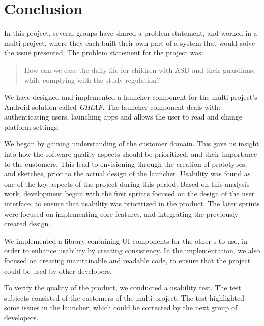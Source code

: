 \chapter{Conclusion}
In this project, several groups have shared a problem statement, and worked in a multi-project, where they each built their own part of a system that would solve the issue presented. 
The problem statement for the project was:    
 
\begin{quotation}
How can we ease the daily life for children with ASD and their guardians, while complying with the study regulation? 
\end{quotation}

We have designed and implemented a launcher component for the multi-project's Android solution called \emph{GIRAF}. The launcher component deals with: authenticating users, launching apps and allows the user to read and change platform settings. 

We began by gaining understanding of the customer domain. This gave us insight into how the software quality aspects should be prioritized, and their importance to the customers. 
This lead to envisioning through the creation of prototypes, and sketches, prior to the actual design of the launcher. Usability was found as one of the key aspects of the project during this period.
Based on this analysis work, development began with the first sprints focused on the design of the user interface, to ensure that usability was prioritized in the product. The later sprints were focused on implementing core features, and integrating the previously created design.

We implemented a library containing UI components for the other \localgroup[]s to use, in order to enhance usability by creating consistency. In the implementation, we also focused on creating maintainable and readable code, to ensure that the project could be used by other developers.

To verify the quality of the product, we conducted a usability test. The test subjects consisted of the customers of the multi-project. The test highlighted some issues in the launcher, which could be corrected by the next group of developers.